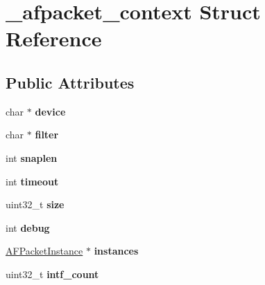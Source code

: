 \hypertarget{struct__afpacket__context}{
\section{\_\-afpacket\_\-context Struct Reference}
\label{struct__afpacket__context}
}
\subsection*{Public Attributes}
\begin{DoxyCompactItemize}
\item 
\hypertarget{struct__afpacket__context_a1f2edc5daae6f3015ecaad949416bc91}{
char $\ast$ {\bfseries device}}
\label{struct__afpacket__context_a1f2edc5daae6f3015ecaad949416bc91}

\item 
\hypertarget{struct__afpacket__context_ad14516253ab570f0379f2a69a43bd9e3}{
char $\ast$ {\bfseries filter}}
\label{struct__afpacket__context_ad14516253ab570f0379f2a69a43bd9e3}

\item 
\hypertarget{struct__afpacket__context_a0b5f83f7a8d0d77ab7ef14de5c4b7ae7}{
int {\bfseries snaplen}}
\label{struct__afpacket__context_a0b5f83f7a8d0d77ab7ef14de5c4b7ae7}

\item 
\hypertarget{struct__afpacket__context_a5b421127cd050a479dd7e06e43f74a0e}{
int {\bfseries timeout}}
\label{struct__afpacket__context_a5b421127cd050a479dd7e06e43f74a0e}

\item 
\hypertarget{struct__afpacket__context_a0c3f7f25a24d760059c3d8c3f1b76288}{
uint32\_\-t {\bfseries size}}
\label{struct__afpacket__context_a0c3f7f25a24d760059c3d8c3f1b76288}

\item 
\hypertarget{struct__afpacket__context_a6d24eabce8e20c39a926b31f64aedba7}{
int {\bfseries debug}}
\label{struct__afpacket__context_a6d24eabce8e20c39a926b31f64aedba7}

\item 
\hypertarget{struct__afpacket__context_a0417e55715215c4225bbb5cd72826c54}{
\hyperlink{struct__af__packet__instance}{AFPacketInstance} $\ast$ {\bfseries instances}}
\label{struct__afpacket__context_a0417e55715215c4225bbb5cd72826c54}

\item 
\hypertarget{struct__afpacket__context_a33eba82a9c4a57b12aa340db59b4b9a2}{
uint32\_\-t {\bfseries intf\_\-count}}
\label{struct__afpacket__context_a33eba82a9c4a57b12aa340db59b4b9a2}


\end{DoxyCompactItemize}
